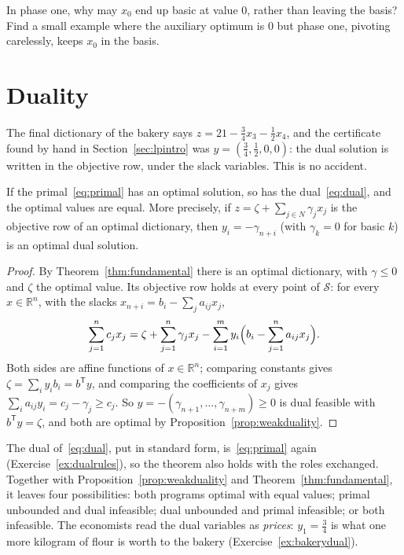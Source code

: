 \begin{think}
In phase one, why may $x_0$ end up basic at value $0$, rather than leaving the basis? Find a small example where the auxiliary optimum is $0$ but phase one, pivoting carelessly, keeps $x_0$ in the basis.
\end{think}

\section{Duality}\label{sec:duality}

The final dictionary of the bakery says $z=21-\tfrac34x_3-\tfrac12x_4$, and the certificate found by hand in Section~\ref{sec:lpintro} was $y=(\tfrac34,\tfrac12,0,0)$: the dual solution is written in the objective row, under the slack
variables. This is no accident.

\begin{theorem}\label{thm:strongduality}
If the primal~\eqref{eq:primal} has an optimal solution, so has the dual~\eqref{eq:dual}, and the optimal values are equal. More precisely, if $z=\zeta+\sum_{j\in N}\gamma_jx_j$ is the objective row of an optimal dictionary,
then $y_i=-\gamma_{n+i}$ (with $\gamma_k=0$ for basic $k$) is an optimal dual solution.
\end{theorem}
\begin{proof}
By Theorem~\ref{thm:fundamental} there is an optimal dictionary, with $\gamma\le0$ and $\zeta$ the optimal value. Its objective row holds at every point of $\mathcal S$: for every $x\in\mathbb R^n$, with the slacks
$x_{n+i}=b_i-\sum_ja_{ij}x_j$,
\[
\sum_{j=1}^nc_jx_j=\zeta+\sum_{j=1}^n\gamma_jx_j-\sum_{i=1}^my_i\Bigl(b_i-\sum_{j=1}^na_{ij}x_j\Bigr).
\]
Both sides are affine functions of $x\in\mathbb R^n$; comparing constants gives $\zeta=\sum_iy_ib_i=b^{\mathsf T}y$, and comparing the coefficients of $x_j$ gives $\sum_ia_{ij}y_i=c_j-\gamma_j\ge c_j$. So $y=-(\gamma_{n+1},\dots,\gamma_{n+m})\ge0$ is dual
feasible with $b^{\mathsf T}y=\zeta$, and both are optimal by Proposition~\ref{prop:weakduality}.
\end{proof}

The dual of~\eqref{eq:dual}, put in standard form, is~\eqref{eq:primal} again (Exercise~\ref{ex:dualrules}), so the theorem also holds with the roles exchanged. Together with Proposition~\ref{prop:weakduality} and
Theorem~\ref{thm:fundamental}, it leaves four possibilities: both programs optimal with equal values; primal unbounded and dual infeasible; dual unbounded and primal infeasible; or both infeasible.
The economists read the dual variables as \emph{prices}: $y_1=\tfrac34$ is what one more kilogram of flour is worth to the bakery (Exercise~\ref{ex:bakerydual}).

